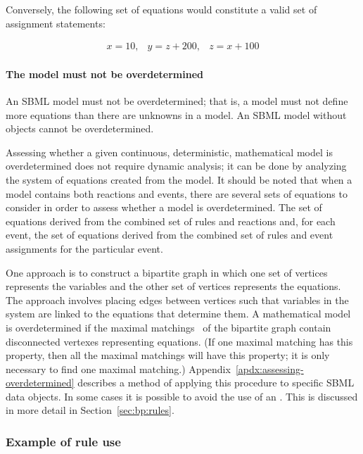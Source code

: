 Conversely, the following set of equations would constitute a
valid set of assignment statements:
\begin{linenomath}
\begin{equation*}
  \begin{array}{lll}
    x = 10, & y = z + 200, & z = x + 100
  \end{array}
\end{equation*}
\end{linenomath}


\paragraph{The model must not be overdetermined}

An SBML model must not be overdetermined; that is, a model must
not define more equations than there are unknowns in a model.  An
SBML model without \AlgebraicRule objects cannot be
overdetermined.

Assessing whether a given continuous, deterministic, mathematical
model is overdetermined does not require dynamic analysis; it can
be done by analyzing the system of equations created from the
model.  It should be noted that when a model contains both
reactions and events, there are several sets of equations to
consider in order to assess whether a model is overdetermined.
The set of equations derived from the combined set of rules and
reactions and, for each event, the set of equations derived from
the combined set of rules and event assignments for the particular
event.

One approach is to construct a bipartite graph in which one set of
vertices represents the variables and the other set of vertices
represents the equations.  The approach involves placing edges
between vertices such that variables in the system are linked to
the equations that determine them.  A mathematical model is
overdetermined if the maximal matchings~\citep{chartrand_1977} of
the bipartite graph contain disconnected vertexes representing
equations.  (If one maximal matching has this property, then all
the maximal matchings will have this property; \ie it is only
necessary to find one maximal matching.)
Appendix~\ref{apdx:assessing-overdetermined} describes a method of
applying this procedure to specific SBML data objects.  In some
cases it is possible to avoid the use of an \AlgebraicRule.  This
is discussed in more detail in Section~\ref{sec:bp:rules}.


\subsubsection{Example of rule use}
\label{sec:eg-rule-use}


